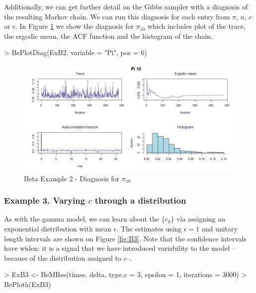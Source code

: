 \documentclass[letterpaper]{article}
\begin{document}
Additionally, we can get further detail on the Gibbs sampler with a diagnosis of the resulting Markov chain. We can run this diagnosis for each entry from $\pi$, $u$, $c$ or $\epsilon$. In Figure \ref{fig:B2a} we show the diagnosis for $\pi_{10}$ which includes plot of the trace, the ergodic mean, the ACF function and the histogram of the chain.

\begin{Schunk}
\begin{Sinput}
> BePlotDiag(ExB2, variable = "Pi", pos = 6)
\end{Sinput}
\end{Schunk}

\begin{figure}
  \centering
  \includegraphics[width=\textwidth]{B23.png}
  \caption{Beta Example 2 - Diagnosis for $\pi_{10}$}
  \label{fig:B2a}
\end{figure}

\subsubsection{Example 3. Varying $c$ through a distribution}

As with the gamma model, we can learn about the $\{c_k\}$ via assigning an exponential distribution with mean $\epsilon$. The estimates using $\epsilon = 1$ and unitary length intervals are shown on Figure \ref{fig:B3}. Note that the confidence intervals have widen: it is a signal that we have introduced variability to the model --because of the distribution assigned to $c$--.
 
\begin{Schunk}
\begin{Sinput}
> ExB3 <- BeMRes(times, delta, type.c = 3, epsilon = 1, iterations = 3000)
> BePloth(ExB3)
\end{Sinput}
\end{Schunk}
\end{document}
